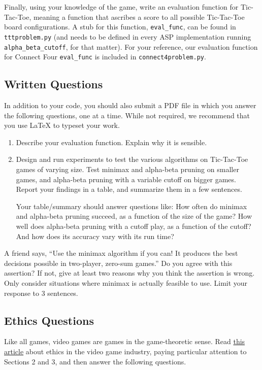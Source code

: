 \documentclass{article}
\begin{document}
Finally, using your knowledge of the game, write an evaluation
function for Tic-Tac-Toe, meaning a function that ascribes a score to
all possible Tic-Tac-Toe board configurations.  A stub for this
function, \verb|eval_func|, can be found in \verb|tttproblem.py| (and needs to be defined in every ASP implementation running \verb|alpha_beta_cutoff|, for that matter).
%
For your reference,
our evaluation function for Connect Four \verb|eval_func| is included in \verb|connect4problem.py|.


\subsection{Written Questions}
In addition to your code, you should also submit a PDF file in which you
answer the following questions, one at a time.  While not required, we
recommend that you use \LaTeX{} to typeset your work.

\begin{enumerate}
  \item Describe your evaluation function. Explain why it is sensible.

  \item Design and run experiments to test the various algorithms on Tic-Tac-Toe games of varying size.
    Test minimax and alpha-beta pruning on smaller games,
    and alpha-beta pruning with a variable cutoff on bigger games.
    Report your findings in a table, and summarize them in a few sentences.

    Your table/summary should answer questions like:
    How often do minimax and alpha-beta pruning succeed,
    as a function of the size of the game?
    How well does alpha-beta pruning with a cutoff play, as a function of the cutoff?
    And how does its accuracy vary with its run time?
\end{enumerate}

A friend says, ``Use the minimax algorithm if you can!
It produces the best decisions possible in two-player, zero-sum games.''
Do you agree with this assertion?
If not, give at least two reasons why you think the assertion is wrong.
Only consider situations where minimax is actually feasible to use.
Limit your response to 3 sentences.
\fi


\subsection{Ethics Questions}
Like all games, video games are games in the game-theoretic sense. Read \href{https://www.gamasutra.com/blogs/CeliaHodent/20191220/356013/Ethics_in_the_Videogame_Industry_A_Mythbusting_and_Scientific_Approach.php}{this article} about ethics in the video game industry, paying particular attention to Sections 2 and 3, and then answer the following questions.
\end{document}
